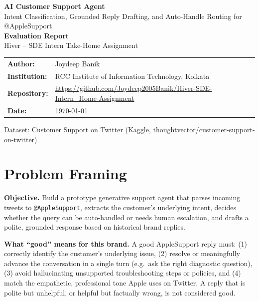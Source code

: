 \documentclass[11pt]{article}
\begin{document}
\begin{titlepage}
\centering
\vspace*{2.5cm}
{\Huge\bfseries\color{accent} AI Customer Support Agent}\\[0.4cm]
{\Large\color{accentlight} Intent Classification, Grounded Reply Drafting, and Auto-Handle Routing for @AppleSupport}\\[2cm]

{\large\bfseries Evaluation Report}\\[0.3cm]
{\large Hiver -- SDE Intern Take-Home Assignment}\\[2.5cm]

\begin{tabular}{ll}
\textbf{Author:} & Joydeep Banik \\
\textbf{Institution:} & RCC Institute of Information Technology, Kolkata \\
\textbf{Repository:} & \url{https://github.com/Joydeep2005Banik/Hiver-SDE-Intern_Home-Assignment} \\
\textbf{Date:} & \today \\
\end{tabular}

\vfill
{\small Dataset: Customer Support on Twitter (Kaggle, thoughtvector/customer-support-on-twitter)}
\end{titlepage}

\section{Problem Framing}

\textbf{Objective.} Build a prototype generative support agent that parses incoming tweets to \texttt{@AppleSupport}, extracts the customer's underlying intent, decides whether the query can be auto-handled or needs human escalation, and drafts a polite, grounded response based on historical brand replies.

\textbf{What ``good'' means for this brand.} A good AppleSupport reply must: (1) correctly identify the customer's underlying issue, (2) resolve or meaningfully advance the conversation in a single turn (e.g.\ ask the right diagnostic question), (3) avoid hallucinating unsupported troubleshooting steps or policies, and (4) match the empathetic, professional tone Apple uses on Twitter. A reply that is polite but unhelpful, or helpful but factually wrong, is not considered good.
\end{document}
